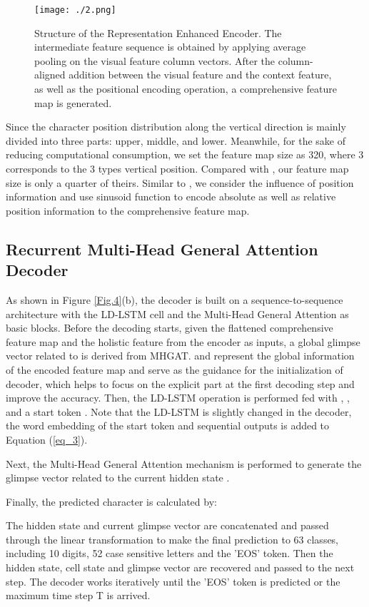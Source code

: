 \documentclass[runningheads]{llncs}
\begin{document}
\begin{figure}
\centering
\texttt{[image: ./2.png]}
\caption{Structure of the Representation Enhanced Encoder. The intermediate feature sequence is obtained by applying average pooling on the visual feature column vectors. After the column-aligned addition between the visual feature and the context feature, as well as the positional encoding operation, a comprehensive feature map is generated.} 
\label{Fig.3}
\end{figure}

Since the character position distribution along the vertical direction is mainly divided into three parts: upper, middle, and lower. Meanwhile, for the sake of reducing computational consumption, we set the feature map size as 320, where 3 corresponds to the 3 types vertical position. Compared with \cite{li2019show,lu2019master,yue2020robustscanner}, our feature map size is only a quarter of theirs. Similar to \cite{vaswani2017attention}, we consider the influence of position information and use sinusoid function to encode absolute as well as relative position information to the comprehensive feature map.

\subsection{Recurrent Multi-Head General Attention Decoder}
As shown in Figure \ref{Fig.4}(b), the decoder is built on a sequence-to-sequence architecture with the LD-LSTM cell and the Multi-Head General Attention as basic blocks. Before the decoding starts, given the flattened comprehensive feature map  and the holistic feature  from the encoder as inputs, a global glimpse vector  related to  is derived from MHGAT.  and  represent the global information of the encoded feature map and serve as the guidance for the initialization of decoder, which helps to focus on the explicit part at the first decoding step and improve the accuracy. Then, the LD-LSTM operation is performed fed with , , and a start token . Note that the LD-LSTM is slightly changed in the decoder, the word embedding of the start token and sequential outputs  is added to Equation (\ref{eq_3}).


Next, the Multi-Head General Attention mechanism is performed to generate the glimpse vector related to the current hidden state .


Finally, the predicted character is calculated by:


The hidden state  and current glimpse vector  are concatenated and passed through the linear transformation to make the final prediction to 63 classes, including 10 digits, 52 case sensitive letters and the 'EOS' token. Then the hidden state, cell state and glimpse vector are recovered and passed to the next step. The decoder works iteratively until the 'EOS' token is predicted or the maximum time step T is arrived.
\end{document}
